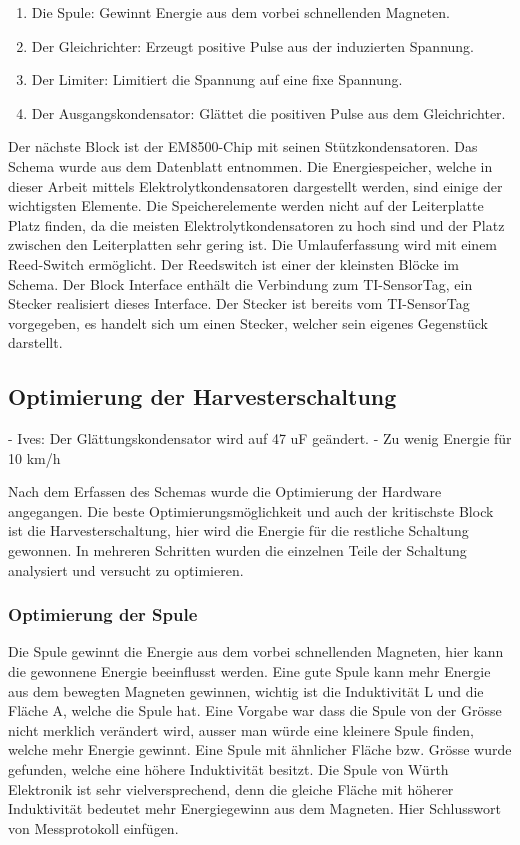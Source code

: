 \begin{enumerate}
    \item Die Spule: Gewinnt Energie aus dem vorbei schnellenden Magneten.
    
    \item Der Gleichrichter: Erzeugt positive Pulse aus der induzierten Spannung.
    
    \item Der Limiter: Limitiert die Spannung auf eine fixe Spannung.
    
    \item Der Ausgangskondensator: Glättet die positiven Pulse aus dem Gleichrichter.
    
\end{enumerate}

Der nächste Block ist der EM8500-Chip mit seinen Stützkondensatoren. Das Schema wurde aus dem Datenblatt entnommen. 
Die Energiespeicher, welche in dieser Arbeit mittels Elektrolytkondensatoren dargestellt werden, sind einige der wichtigsten Elemente. Die Speicherelemente werden nicht auf der Leiterplatte Platz finden, da die meisten Elektrolytkondensatoren zu hoch sind und der Platz zwischen den Leiterplatten sehr gering ist. 
Die Umlauferfassung wird mit einem Reed-Switch ermöglicht. Der Reedswitch ist einer der kleinsten Blöcke im Schema.
Der Block Interface enthält die Verbindung zum TI-SensorTag, ein Stecker realisiert dieses Interface. Der Stecker ist bereits vom TI-SensorTag vorgegeben, es handelt sich um einen Stecker, welcher sein eigenes Gegenstück darstellt. 

\subsection{Optimierung der Harvesterschaltung}
- Ives: Der Glättungskondensator wird auf 47 uF geändert. 
- Zu wenig Energie für 10 km/h

Nach dem Erfassen des Schemas wurde die Optimierung der Hardware angegangen. Die beste Optimierungsmöglichkeit und auch der kritischste Block ist die Harvesterschaltung, hier wird die Energie für die restliche Schaltung gewonnen. In mehreren Schritten wurden die einzelnen Teile der Schaltung analysiert und versucht zu optimieren.

\subsubsection{Optimierung der Spule}

Die Spule gewinnt die Energie aus dem vorbei schnellenden Magneten, hier kann die gewonnene Energie beeinflusst werden. Eine gute Spule kann mehr Energie aus dem bewegten Magneten gewinnen, wichtig ist die Induktivität L und die Fläche A, welche die Spule hat. Eine Vorgabe war dass die Spule von der Grösse nicht merklich verändert wird, ausser man würde eine kleinere Spule finden, welche mehr Energie gewinnt. Eine Spule mit ähnlicher Fläche bzw. Grösse wurde gefunden, welche eine höhere Induktivität besitzt. Die Spule von Würth Elektronik ist sehr vielversprechend, denn die gleiche Fläche mit höherer Induktivität bedeutet mehr Energiegewinn aus dem Magneten.
Hier Schlusswort von Messprotokoll einfügen.

